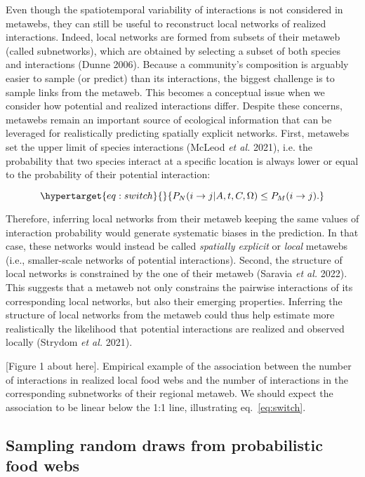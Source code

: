 \documentclass[11pt]{article}
\begin{document}
Even though the spatiotemporal variability of interactions is not
considered in metawebs, they can still be useful to reconstruct local
networks of realized interactions. Indeed, local networks are formed
from subsets of their metaweb (called subnetworks), which are obtained
by selecting a subset of both species and interactions (Dunne 2006).
Because a community's composition is arguably easier to sample (or
predict) than its interactions, the biggest challenge is to sample links
from the metaweb. This becomes a conceptual issue when we consider how
potential and realized interactions differ. Despite these concerns,
metawebs remain an important source of ecological information that can
be leveraged for realistically predicting spatially explicit networks.
First, metawebs set the upper limit of species interactions (McLeod
\emph{et al.} 2021), i.e. the probability that two species interact at a
specific location is always lower or equal to the probability of their
potential interaction:

\begin{equation}\protect\hypertarget{eq:switch}{}{P_{N}(i \rightarrow j | A, t, C, \Omega) \le
P_M(i \rightarrow j).}\label{eq:switch}\end{equation}

Therefore, inferring local networks from their metaweb keeping the same
values of interaction probability would generate systematic biases in
the prediction. In that case, these networks would instead be called
\emph{spatially explicit} or \emph{local} metawebs (i.e., smaller-scale
networks of potential interactions). Second, the structure of local
networks is constrained by the one of their metaweb (Saravia \emph{et
al.} 2022). This suggests that a metaweb not only constrains the
pairwise interactions of its corresponding local networks, but also
their emerging properties. Inferring the structure of local networks
from the metaweb could thus help estimate more realistically the
likelihood that potential interactions are realized and observed locally
(Strydom \emph{et al.} 2021).

{[}Figure 1 about here{]}. Empirical example of the association between
the number of interactions in realized local food webs and the number of
interactions in the corresponding subnetworks of their regional metaweb.
We should expect the association to be linear below the 1:1 line,
illustrating eq.~\ref{eq:switch}.

\hypertarget{sampling-random-draws-from-probabilistic-food-webs}{%
\subsection{Sampling random draws from probabilistic food
webs}\label{sampling-random-draws-from-probabilistic-food-webs}}
\end{document}
